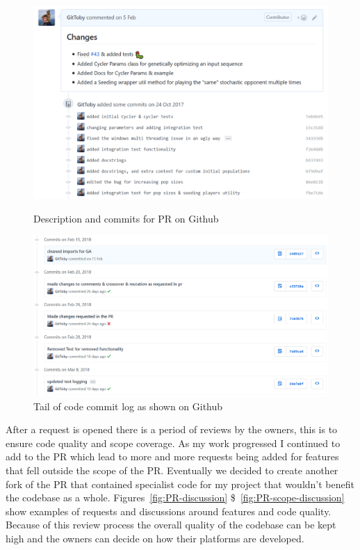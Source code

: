 \begin{figure}[ht]
    \centering
    \begin{minipage}{0.48\textwidth}
        \centering
        \includegraphics[width=1.0\textwidth, center]{./img/vcs/PR-Open.png}
        \caption{Description and commits for PR on Github}\label{fig:PR-open}
    \end{minipage}\hfill
    \begin{minipage}{0.48\textwidth}
        \centering
        \includegraphics[width=1.0\textwidth, center,keepaspectratio]{./img/vcs/commit-log.png}    
        \caption{Tail of code commit log as shown on Github}\label{fig:commit-log}
    \end{minipage}
\end{figure}

After a request is opened there is a period of reviews by the owners, this is to ensure code quality and scope coverage. 
As my work progressed I continued to add to the PR which lead to more and more requests being added for features that fell outside the scope of the PR.
Eventually we decided to create another fork of the PR that contained specialist code for my project that wouldn't benefit the codebase as a whole.
Figures~\ref{fig:PR-discussion} \$~\ref{fig:PR-scope-discussion} show examples of requests and discussions around features and code quality.
Because of this review process the overall quality of the codebase can be kept high and the owners can decide on how their platforms are developed.

